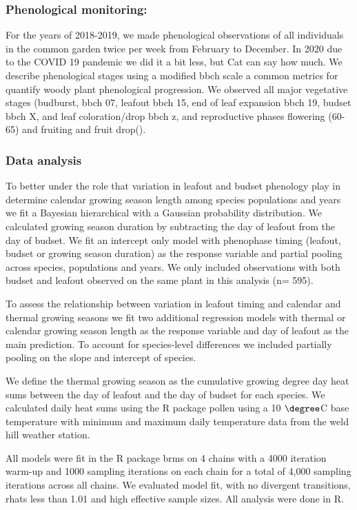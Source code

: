 \documentclass[12 pt]{article}
\begin{document}
\subsubsection{Phenological monitoring:}
For the years of 2018-2019, we made phenological observations of all individuals in the common garden twice per week from February to December. In 2020 due to the COVID 19 pandemic we did it a bit less, but Cat can say how much. We describe phenological stages using a modified bbch scale \citep{} a common metrics for quantify woody plant phenological progression. We observed all major vegetative stages (budburst, bbch 07, leafout bbch 15, end of leaf expansion bbch 19, budset bbch X, and leaf coloration/drop bbch z, and reproductive phases flowering (60-65) and fruiting and fruit drop(). 

\subsubsection{Data analysis}
To better under the role that variation in leafout and budset phenology play in determine calendar growing season length among species populations and years we fit a Bayesian hierarchical with a Gaussian probability distribution. We calculated growing season duration by subtracting the day of leafout from the day of budset. We fit an intercept only model with phenophase timing (leafout, budset or growing season duration) as the response variable and partial pooling across species, populations and years. We only included observations with both budset and leafout observed on the same plant in this analysis (n= 595).

To assess the relationship between variation in leafout timing and calendar and thermal growing seasons we fit two additional regression models with thermal or calendar growing season length as the response variable and day of leafout as the main prediction. To account for species-level differences we included partially pooling on the slope and intercept of species.

We define the thermal growing season as the cumulative growing degree day heat sums between the day of leafout and the day of budset for each species. We calculated daily heat sums using the R package pollen \citep{} using a 10 $\degree$C base temperature with minimum and maximum daily temperature data from the weld hill weather station.

All models were fit in the R package brms on 4 chains with a 4000 iteration warm-up and 1000 sampling iterations on each chain for a total of 4,000 sampling iterations across all chains. We evaluated model fit, with no divergent transitions, rhats less than 1.01 and high effective sample sizes. All analysis were done in R.
\end{document}
